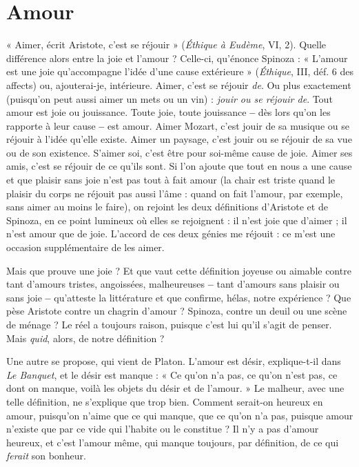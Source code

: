 \section{Amour}
« Aimer, écrit Aristote, c’est se réjouir » ({\it Éthique à Eudème}, VI, 2).
Quelle différence alors entre la joie et l’amour ? Celle-ci, qu'énonce
Spinoza : « L'amour est une joie qu’accompagne l’idée d’une cause extérieure »
({\it Éthique}, III, déf. 6 des affects) ou, ajouterai-je, intérieure. Aimer, c’est se
réjouir {\it de}. Ou plus exactement (puisqu'on peut aussi aimer un mets ou un
vin) : {\it jouir ou se réjouir de}. Tout amour est joie ou jouissance. Toute joie, toute
jouissance {\bf --} dès lors qu’on les rapporte à leur cause {\bf --} est amour. Aimer Mozart,
c’est jouir de sa musique ou se réjouir à l’idée qu’elle existe. Aimer un paysage,
c’est jouir ou se réjouir de sa vue ou de son existence. S’aimer soi, c'est être
pour soi-même cause de joie. Aimer ses amis, c’est se réjouir de ce qu'ils sont.
Si l’on ajoute que tout en nous a une cause et que plaisir sans joie n'est pas tout
à fait amour (la chair est triste quand le plaisir du corps ne réjouit pas aussi
l’âme : quand on fait l'amour, par exemple, sans aimer au moins le faire), on
rejoint les deux définitions d’Aristote et de Spinoza, en ce point lumineux où
elles se rejoignent : il n’est joie que d’aimer ; il n’est amour que de joie.
L'accord de ces deux génies me réjouit : ce m'est une occasion supplémentaire
de les aimer.

Mais que prouve une joie ? Et que vaut cette définition joyeuse ou aimable
contre tant d’amours tristes, angoissées, malheureuses {\bf --} tant d’amours sans
plaisir ou sans joie {\bf --} qu’atteste la littérature et que confirme, hélas, notre
expérience ? Que pèse Aristote contre un chagrin d'amour ? Spinoza, contre un
deuil ou une scène de ménage ? Le réel a toujours raison, puisque c’est lui qu’il
s’agit de penser. Mais {\it quid}, alors, de notre définition ?

Une autre se propose, qui vient de Platon. L'amour est désir, explique-t-il
dans {\it Le Banquet}, et le désir est manque : « Ce qu’on n’a pas, ce qu’on n’est pas,
ce dont on manque, voilà les objets du désir et de l’amour. » Le malheur, avec
une telle définition, ne s'explique que trop bien. Comment serait-on heureux
en amour, puisqu'on n’aime que ce qui manque, que ce qu’on n’a pas, puisque
amour n'existe que par ce vide qui l’habite ou le constitue ? Il n’y a pas
d'amour heureux, et c’est l'amour même, qui manque toujours, par définition,
de ce qui {\it ferait} son bonheur.

